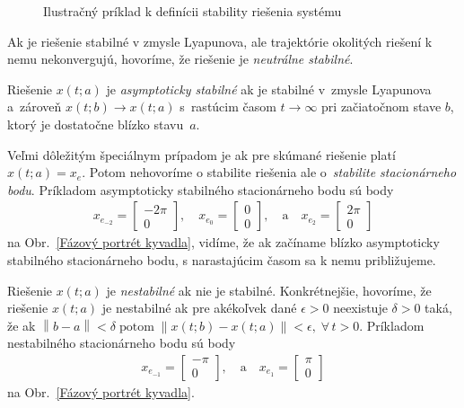 \documentclass[a4paper, 10pt, ]{article}
\begin{document}
\begin{figure}[t]
	\centering

	\subfloat[]{\label{Trajektórie stavu kyvadla v stavovom priestore}}%
	\subfloat[]{\label{Trajektória rozdielu dvoch riešení daných začiatočnými stavmi }}%

		\vspace{-10mm}
	\caption{Ilustračný príklad k definícii stability riešenia systému}
	\label{Ilustračný príklad k definícii stability riešenia systému}
\end{figure}








Ak je riešenie stabilné v zmysle Lyapunova, ale trajektórie okolitých riešení k nemu nekonvergujú, hovoríme, že riešenie je \emph{neutrálne stabilné}.

Riešenie $x(t;a)$ je \emph{asymptoticky stabilné} ak je stabilné v~zmysle Lyapunova a~zároveň $x(t;b) \to x(t;a)$ s~rastúcim časom $t \to \infty$ pri začiatočnom stave $b$, ktorý je dostatočne blízko stavu~$a$.

Veľmi dôležitým špeciálnym prípadom je ak pre skúmané riešenie platí $x(t;a) = x_e$. Potom nehovoríme o stabilite riešenia ale o~\emph{stabilite stacionárneho bodu}. Príkladom asymptoticky stabilného stacionárneho bodu sú body
\begin{align*}
	x_{e_{-2}} =
	\begin{bmatrix}
		-2\pi \\ 0
	\end{bmatrix},
	\quad
	x_{e_{0}} =
	\begin{bmatrix}
		0 \\ 0
	\end{bmatrix},
	\quad
	\text{a}
	\quad
	x_{e_{2}} =
	\begin{bmatrix}
		2 \pi \\ 0
	\end{bmatrix}
\end{align*}
na Obr.~\ref{Fázový portrét kyvadla}, vidíme, že ak začíname blízko asymptoticky stabilného stacionárneho bodu, s narastajúcim časom sa k nemu približujeme.

Riešenie $x(t;a)$ je \emph{nestabilné} ak nie je stabilné. Konkrétnejšie, hovoríme, že riešenie $x(t;a)$ je nestabilné ak pre akékoľvek dané $\epsilon > 0$ neexistuje $\delta > 0$ taká, že ak $\left\| b - a \right\| < \delta \; \text{potom} \; \left\| x(t;b) - x(t;a) \right\| < \epsilon, \; \forall \, t>0$. Príkladom nestabilného stacionárneho bodu sú body
\begin{align*}
	x_{e_{-1}} =
	\begin{bmatrix}
		-\pi \\ 0
	\end{bmatrix},
	\quad
	\text{a}
	\quad
	x_{e_{1}} =
	\begin{bmatrix}
		\pi \\ 0
	\end{bmatrix}
\end{align*}
na Obr.~\ref{Fázový portrét kyvadla}.
\end{document}
